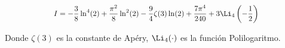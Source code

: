 \begin{LnxRptaBox} 
	 \begin{equation*}
		\scalebox{0.9}{
			$\displaystyle 
			 I = -\frac{3}{8}\ln^4 (2 )+ \frac{\pi^2}{8}\ln^2 (2) - \frac{9}{4}\zeta(3)\ln (2) + \frac{7\pi^4}{240} + 3\Li_4\left(-\frac{1}{2}\right)
			$}
	\end{equation*} 
\end{LnxRptaBox} 
Donde $\zeta(3)$ es la constante de Apéry, $\Li_4(\cdot)$ es la función Polilogaritmo.
